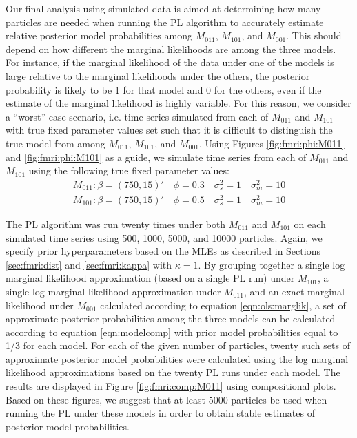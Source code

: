 Our final analysis using simulated data is aimed at determining how many particles are needed when running the PL algorithm to accurately estimate relative posterior model probabilities among $M_{011}$, $M_{101}$, and $M_{001}$. This should depend on how different the marginal likelihoods are among the three models. For instance, if the marginal likelihood of the data under one of the models is large relative to the marginal likelihoods under the others, the posterior probability is likely to be 1 for that model and 0 for the others,  even if the estimate of the marginal likelihood is highly variable. For this reason, we consider a ``worst'' case scenario, i.e. time series simulated from each of $M_{011}$ and $M_{101}$ with true fixed parameter values set such that it is difficult to distinguish the true model from among $M_{011}$, $M_{101}$, and $M_{001}$. Using Figures \ref{fig:fmri:phi:M011} and \ref{fig:fmri:phi:M101} as a guide, we simulate time series from each of $M_{011}$ and $M_{101}$ using the following true fixed parameter values:
\begin{align}
M_{011}: \beta = (750,15)' \quad \phi = 0.3 \quad \sigma^2_s = 1 \quad \sigma^2_m = 10 \label{eqn:fmri:sim:M011} \\
M_{101}: \beta = (750,15)' \quad \phi = 0.5 \quad \sigma^2_s = 1 \quad \sigma^2_m = 10 \label{eqn:fmri:sim:M101}
\end{align}

The PL algorithm was run twenty times under both $M_{011}$ and $M_{101}$ on each simulated time series using 500, 1000, 5000, and 10000 particles. Again, we specify prior hyperparameters based on the MLEs as described in Sections \ref{sec:fmri:dist} and \ref{sec:fmri:kappa} with $\kappa = 1$. By grouping together a single log marginal likelihood approximation (based on a single PL run) under $M_{101}$, a single log marginal likelihood approximation under $M_{011}$, and an exact marginal likelihood under $M_{001}$ calculated according to equation \eqref{eqn:ols:marglik}, a set of approximate posterior probabilities among the three models can be calculated according to equation \eqref{eqn:modelcomp} with prior model probabilities equal to 1/3 for each model. For each of the given number of particles, twenty such sets of approximate posterior model probabilities were calculated using the log marginal likelihood approximations based on the twenty PL runs under each model. The results are displayed in Figure \ref{fig:fmri:comp:M011} using compositional plots. Based on these figures, we suggest that at least 5000 particles be used when running the PL under these models in order to obtain stable estimates of posterior model probabilities.

